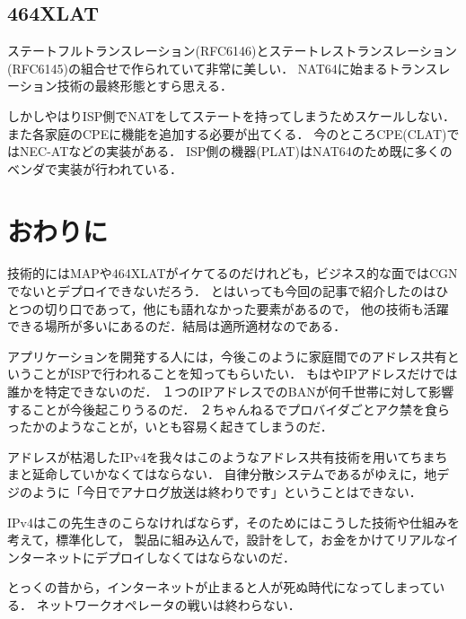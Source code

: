 \subsection{464XLAT}
ステートフルトランスレーション(RFC6146)とステートレストランスレーション(RFC6145)の組合せで作られていて非常に美しい．
NAT64に始まるトランスレーション技術の最終形態とすら思える．

しかしやはりISP側でNATをしてステートを持ってしまうためスケールしない．
また各家庭のCPEに機能を追加する必要が出てくる．
今のところCPE(CLAT)ではNEC-ATなどの実装がある．
ISP側の機器(PLAT)はNAT64のため既に多くのベンダで実装が行われている．

\section{おわりに}

技術的にはMAPや464XLATがイケてるのだけれども，ビジネス的な面ではCGNでないとデプロイできないだろう．
とはいっても今回の記事で紹介したのはひとつの切り口であって，他にも語れなかった要素があるので，
他の技術も活躍できる場所が多いにあるのだ．結局は適所適材なのである．

アプリケーションを開発する人には，今後このように家庭間でのアドレス共有ということがISPで行われることを知ってもらいたい．
もはやIPアドレスだけでは誰かを特定できないのだ．
１つのIPアドレスでのBANが何千世帯に対して影響することが今後起こりうるのだ．
２ちゃんねるでプロバイダごとアク禁を食らったかのようなことが，いとも容易く起きてしまうのだ．

アドレスが枯渇したIPv4を我々はこのようなアドレス共有技術を用いてちまちまと延命していかなくてはならない．
自律分散システムであるがゆえに，地デジのように「今日でアナログ放送は終わりです」ということはできない．

IPv4はこの先生きのこらなければならず，そのためにはこうした技術や仕組みを考えて，標準化して，
製品に組み込んで，設計をして，お金をかけてリアルなインターネットにデプロイしなくてはならないのだ．

とっくの昔から，インターネットが止まると人が死ぬ時代になってしまっている．
ネットワークオペレータの戦いは終わらない．

